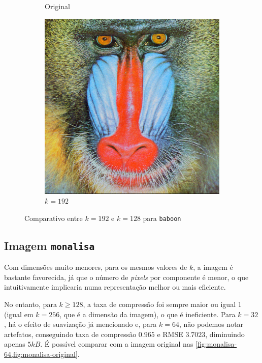 \documentclass[brazilian,a4paper,twocolumn]{article}
\begin{document}
\begin{figure}[h]
\begin{subfigure}{0.27\textwidth}
                \caption{Original}
                \label{fig:baboon-original}
            \end{subfigure}
            \begin{subfigure}{0.27\textwidth}
                \includegraphics[width=\textwidth,keepaspectratio]{baboon-192}
                \caption{$k=192$}
                \label{fig:baboon-192}
            \end{subfigure}

            \caption{Comparativo entre $k=192$ e $k=128$ para \texttt{baboon}}
            \label{fig:baboon-comparativo}
        \end{figure}

    \subsection{Imagem \texttt{monalisa}}

        Com dimensões muito menores, para os mesmos valores de $k$, a imagem é bastante favorecida, já que o número de \textit{pixels} por componente é menor, o que intuitivamente implicaria numa representação melhor ou mais eficiente.

        No entanto, para $k \geq 128$, a taxa de compressão foi sempre maior ou igual 1 (igual em $k = 256$, que é a dimensão da imagem), o que é ineficiente. Para $k = 32$, há o efeito de suavização já mencionado e, para $k = 64$, não podemos notar artefatos, conseguindo taxa de compressão $0.965$ e RMSE $3.7023$, diminuindo apenas $5 kB$. É possível comparar com a imagem original nas \cref{fig:monalisa-64,fig:monalisa-original}.
\end{document}
